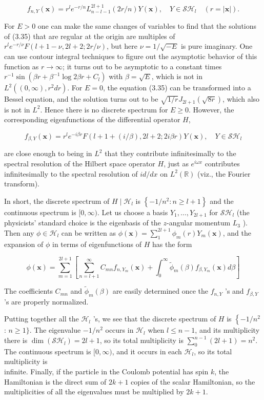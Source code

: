 \documentclass[10pt, letterpaper]{article}
\begin{document}
$$
f_{n, Y}(\mathbf{x})=r^{l} e^{-r / n} L_{n-l-1}^{2 l+1}(2 r / n) Y(\mathbf{x}), \quad Y \in \mathcal{S} \mathcal{H}_{l} \quad(r=|\mathbf{x}|) .
$$

For $E>0$ one can make the same changes of variables to find that the solutions of (3.35) that are regular at the origin are multiples of $r^{l} e^{-r / \nu} F(l+1-\nu, 2 l+ 2 ; 2 r / \nu)$, but here $\nu=1 / \sqrt{-E}$ is pure imaginary. One can use contour integral techniques to figure out the asymptotic behavior of this function as $r \rightarrow \infty$; it turns out to be asymptotic to a constant times $r^{-1} \sin \left(\beta r+\beta^{-1} \log 2 \beta r+C_{l}\right)$ with $\beta=\sqrt{E}$, which is not in $L^{2}\left((0, \infty), r^{2} d r\right)$. For $E=0$, the equation (3.35) can be transformed into a Bessel equation, and the solution turns out to be $\sqrt{1 / r} J_{2 l+1}(\sqrt{8 r})$, which also is not in $L^{2}$. Hence there is no discrete spectrum for $E \geq 0$. However, the corresponding eigenfunctions of the differential operator $H$,

$$
f_{\beta, Y}(\mathbf{x})=r^{l} e^{-i \beta r} F(l+1+(i / \beta), 2 l+2 ; 2 i \beta r) Y(\mathbf{x}), \quad Y \in \mathcal{S} \mathcal{H}_{l}
$$

are close enough to being in $L^{2}$ that they contribute infinitesimally to the spectral resolution of the Hilbert space operator $H$, just as $e^{i \omega x}$ contributes infinitesimally to the spectral resolution of $i d / d x$ on $L^{2}(\mathbb{R})$ (viz., the Fourier transform).

In short, the discrete spectrum of $H \mid \mathcal{H}_{l}$ is $\left\{-1 / n^{2}: n \geq l+1\right\}$ and the continuous spectrum is $[0, \infty)$. Let us choose a basis $Y_{1}, \ldots, Y_{2 l+1}$ for $\mathcal{S} \mathcal{H}_{l}$ (the physicists' standard choice is the eigenbasis of the $z$-angular momentum $L_{3}$ ). Then any $\phi \in \mathcal{H}_{l}$ can be written as $\phi(\mathbf{x})=\sum_{1}^{2 l+1} \phi_{m}(r) Y_{m}(\mathbf{x})$, and the expansion of $\phi$ in terms of eigenfunctions of $H$ has the form

$$
\phi(\mathbf{x})=\sum_{m=1}^{2 l+1}\left[\sum_{n=l+1}^{\infty} C_{m n} f_{n, Y_{m}}(\mathbf{x})+\int_{0}^{\infty} \widetilde{\phi}_{m}(\beta) f_{\beta, Y_{m}}(\mathbf{x}) d \beta\right]
$$

The coefficients $C_{m n}$ and $\widetilde{\phi}_{m}(\beta)$ are easily determined once the $f_{n, Y}$ 's and $f_{\beta, Y}$ 's are properly normalized.

Putting together all the $\mathcal{H}_{l}$ 's, we see that the discrete spectrum of $H$ is $\left\{-1 / n^{2}\right.$ : $n \geq 1\}$. The eigenvalue $-1 / n^{2}$ occurs in $\mathcal{H}_{l}$ when $l \leq n-1$, and its multiplicity there is $\operatorname{dim}\left(\mathcal{S} \mathcal{H}_{l}\right)=2 l+1$, so its total multiplicity is $\sum_{0}^{n-1}(2 l+1)=n^{2}$. The continuous spectrum is $[0, \infty)$, and it occurs in each $\mathcal{H}_{l}$, so its total multiplicity is\\
infinite. Finally, if the particle in the Coulomb potential has spin $k$, the Hamiltonian is the direct sum of $2 k+1$ copies of the scalar Hamiltonian, so the multiplicities of all the eigenvalues must be multiplied by $2 k+1$.
\end{document}
